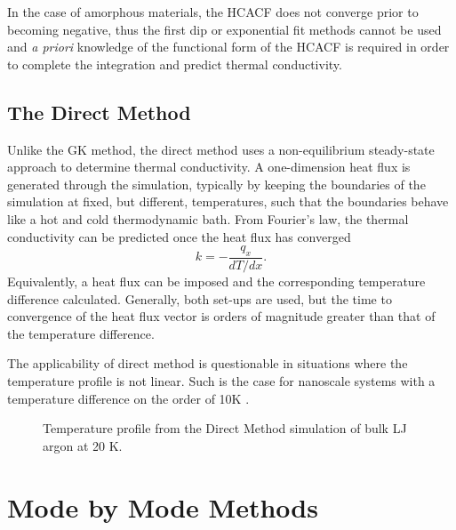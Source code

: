 In the case of amorphous materials, the HCACF does not converge prior to becoming negative, thus the first dip or exponential fit methods cannot be used and \textit{a priori} knowledge of the functional form of the HCACF is required in order to complete the integration and predict thermal conductivity.

\subsection{The Direct Method}

Unlike the GK method, the direct method uses a non-equilibrium steady-state approach to determine thermal conductivity. A one-dimension heat flux is generated through the simulation, typically by keeping the boundaries of the simulation at fixed, but different, temperatures, such that the boundaries behave like a hot and cold thermodynamic bath. From Fourier's law, the thermal conductivity can be predicted once the heat flux has converged
%
\begin{equation}\label{EQ:DM_k}
k=-\frac{q_x}{dT/dx}.
\end{equation}
%
Equivalently, a heat flux can be imposed and the corresponding temperature difference calculated. Generally, both set-ups are used, but the time to convergence of the heat flux vector is orders of magnitude greater than that of the temperature difference.

The applicability of direct method is questionable in situations where the temperature profile is not linear. Such is the case for nanoscale systems with a temperature difference on the order of 10K \cite{mcgaugheythesis}.
%
\begin{figure}
\begin{center}
\renewcommand{\figure}{Fig.}
\caption{Temperature profile from the Direct Method simulation of bulk LJ argon at 20 K.}
\label{FIG:GK_bulk}
\end{center}
\end{figure}
%
%
\section{Mode by Mode Methods}
